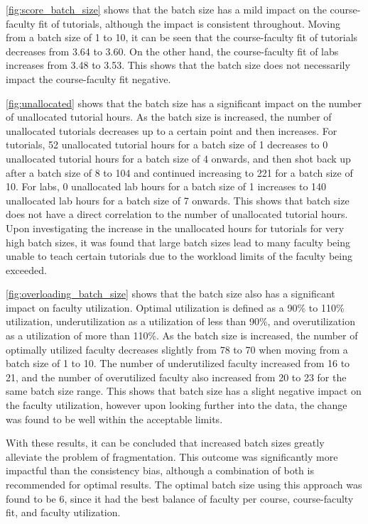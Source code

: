 \autoref{fig:score_batch_size} shows that the batch size has a mild impact on the course-faculty fit of tutorials, although the impact is consistent throughout. Moving from a batch size of 1 to 10, it can be seen that the course-faculty fit of tutorials decreases from 3.64 to 3.60. On the other hand, the course-faculty fit of labs increases from 3.48 to 3.53. This shows that the batch size does not necessarily impact the course-faculty fit negative.

\autoref{fig:unallocated} shows that the batch size has a significant impact on the number of unallocated tutorial hours. As the batch size is increased, the number of unallocated tutorials decreases up to a certain point and then increases. For tutorials, 52 unallocated tutorial hours for a batch size of 1 decreases to 0 unallocated tutorial hours for a batch size of 4 onwards, and then shot back up after a batch size of 8 to 104 and continued increasing to 221 for a batch size of 10. For labs, 0 unallocated lab hours for a batch size of 1 increases to 140 unallocated lab hours for a batch size of 7 onwards. This shows that batch size does not have a direct correlation to the number of unallocated tutorial hours. Upon investigating the increase in the unallocated hours for tutorials for very high batch sizes, it was found that large batch sizes lead to many faculty being unable to teach certain tutorials due to the workload limits of the faculty being exceeded.

\autoref{fig:overloading_batch_size} shows that the batch size also has a significant impact on faculty utilization. Optimal utilization is defined as a 90\% to 110\% utilization, underutilization as a utilization of less than 90\%, and overutilization as a utilization of more than 110\%. As the batch size is increased, the number of optimally utilized faculty decreases slightly from 78 to 70 when moving from a batch size of 1 to 10. The number of underutilized faculty increased from 16 to 21, and the number of overutilized faculty also increased from 20 to 23 for the same batch size range. This shows that batch size has a slight negative impact on the faculty utilization, however upon looking further into the data, the change was found to be well within the acceptable limits.

With these results, it can be concluded that increased batch sizes greatly alleviate the problem of fragmentation. This outcome was significantly more impactful than the consistency bias, although a combination of both is recommended for optimal results. The optimal batch size using this approach was found to be 6, since it had the best balance of faculty per course, course-faculty fit, and faculty utilization.

